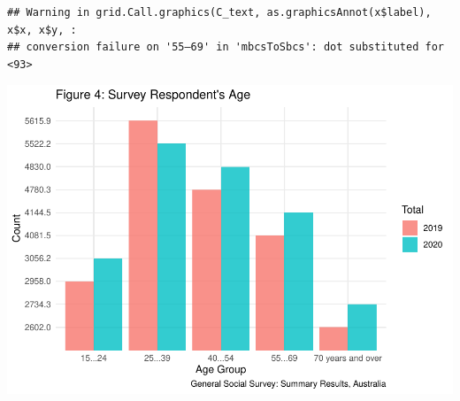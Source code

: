 \documentclass[
]{article}
\begin{document}
\begin{verbatim}
## Warning in grid.Call.graphics(C_text, as.graphicsAnnot(x$label), x$x, x$y, :
## conversion failure on '55–69' in 'mbcsToSbcs': dot substituted for <93>
\end{verbatim}

\includegraphics{P3_files/figure-latex/unnamed-chunk-6-1.pdf}
\end{document}
